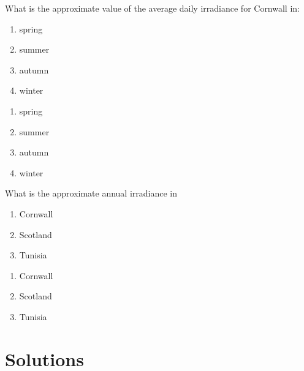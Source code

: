 \documentclass{article} %
\begin{document}
\begin{question}
    What is the approximate value of the average daily irradiance for Cornwall in:
    \begin{enumerate}[label=\alph*)]
        \item spring
        \item summer
        \item autumn
        \item winter
    \end{enumerate}
\end{question}
\begin{solution}
    \begin{enumerate}[label=\alph*)]
        \item spring \ 
        \item summer \ 
        \item autumn \ 
        \item winter \ 
    \end{enumerate}
\end{solution}

\begin{question}
What is the approximate annual irradiance in
    \begin{enumerate}[label=\alph*)]
        \item Cornwall
        \item Scotland
        \item Tunisia
    \end{enumerate}
\end{question}
\begin{solution}
    \begin{enumerate}[label=\alph*)]
        \item Cornwall \ 
        \item Scotland \ 
        \item Tunisia \ 
    \end{enumerate}
\end{solution}
\printbibliography
\section*{Solutions}
\printsolutions
\end{document}
